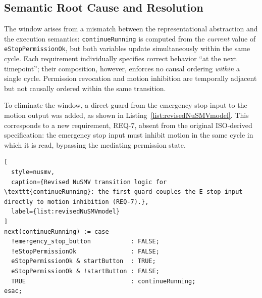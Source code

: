 \documentclass{ieeeaccess}
\theoremstyle{definition}
\begin{document}
\subsection{Semantic Root Cause and Resolution}
The window arises from a mismatch between the representational abstraction and the execution semantics: \texttt{continueRunning} is computed from the \emph{current} value of \texttt{eStopPermissionOk}, but both variables update simultaneously within the same cycle. Each requirement individually specifies correct behavior ``at the next timepoint''; their composition, however, enforces no causal ordering \emph{within} a single cycle. Permission revocation and motion inhibition are temporally adjacent but not causally ordered within the same transition.

To eliminate the window, a direct guard from the emergency stop input to the motion output was added, as shown in Listing~\ref{list:revisedNuSMVmodel}. This corresponds to a new requirement, REQ-7, absent from the original ISO-derived specification: the emergency stop input must inhibit motion in the same cycle in which it is read, bypassing the mediating permission state.

\begin{lstlisting}[
  style=nusmv,
  caption={Revised NuSMV transition logic for \texttt{continueRunning}: the first guard couples the E-stop input directly to motion inhibition (REQ-7).},
  label={list:revisedNuSMVmodel}
]
next(continueRunning) := case
  !emergency_stop_button           : FALSE;
  !eStopPermissionOk               : FALSE;
  eStopPermissionOk & startButton  : TRUE;
  eStopPermissionOk & !startButton : FALSE;
  TRUE                             : continueRunning;
esac;
\end{lstlisting}
\end{document}
